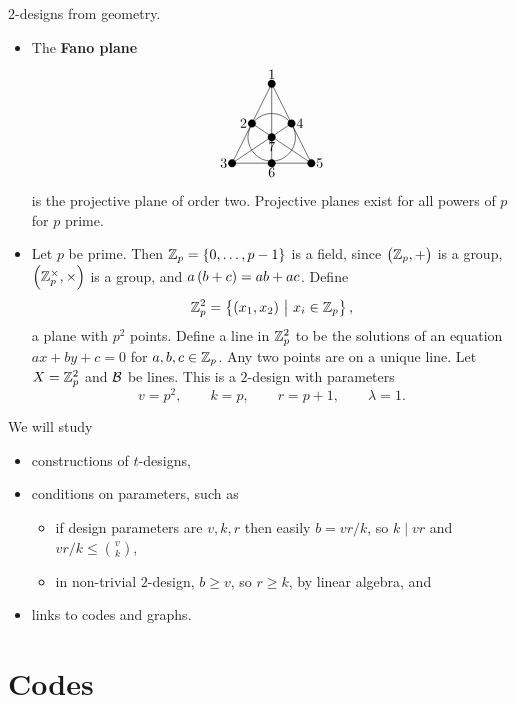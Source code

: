 \begin{example*}
$ 2 $-designs from geometry.
\begin{itemize}
\item The \textbf{Fano plane}
$$
\begin{tikzpicture}
\fill (0, 0) circle (0.1) node[above]{$ 1 $};
\fill (-0.5, -1) circle (0.1) node[left]{$ 2 $};
\fill (0.5, -1) circle (0.1) node[right]{$ 4 $};
\fill (0, -1.35) circle (0.1) node[below]{$ 7 $};
\fill (-1, -2) circle (0.1) node[left]{$ 3 $};
\fill (0, -2) circle (0.1) node[below]{$ 6 $};
\fill (1, -2) circle (0.1) node[right]{$ 5 $};
\draw (0, 0) to (-1, -2);
\draw (0, 0) to (0, -2);
\draw (0, 0) to (1, -2);
\draw (-0.5, -1) to (1, -2);
\draw (0.5, -1) to (-1, -2);
\draw (-1, -2) to (1, -2);
\draw (0, -1.35) circle (0.6);
\end{tikzpicture}
$$
is the projective plane of order two. Projective planes exist for all powers of $ p $ for $ p $ prime.
\item Let $ p $ be prime. Then $ \ZZ_p = \cbr{0, \dots, p - 1} $ is a field, since $ \br{\ZZ_p, +} $ is a group, $ \br{\ZZ_p^\times, \times} $ is a group, and $ a\br{b + c} = ab + ac $. Define
$$ \ZZ_p^2 = \cbr{\br{x_1, x_2} \st x_i \in \ZZ_p}, $$
a plane with $ p^2 $ points. Define a line in $ \mathbb{Z}_p^2 $ to be the solutions of an equation $ ax + by + c = 0 $ for $ a, b, c \in \mathbb{Z}_p $. Any two points are on a unique line. Let $ X = \mathbb{Z}_p^2 $ and $ \mathcal{B} $ be lines. This is a $ 2 $-design with parameters
$$ v = p^2, \qquad k = p, \qquad r = p + 1, \qquad \lambda = 1. $$
\end{itemize}
\end{example*}

We will study
\begin{itemize}
\item constructions of $ t $-designs,
\item conditions on parameters, such as
\begin{itemize}
\item if design parameters are $ v, k, r $ then easily $ b = vr / k $, so $ k \mid vr $ and $ vr / k \le \binom{v}{k} $,
\item in non-trivial $ 2 $-design, $ b \ge v $, so $ r \ge k $, by linear algebra, and
\end{itemize}
\item links to codes and graphs.
\end{itemize}

\pagebreak

\section{Codes}

